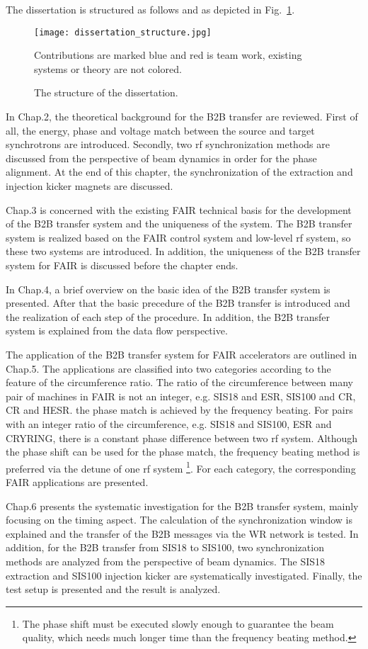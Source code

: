 The dissertation is structured as follows and as depicted in Fig.~\ref{dissertation_structure}.
\begin{figure}[!htb]
   \centering   
   \texttt{[image: dissertation\_structure.jpg]}
   \caption{The structure of the dissertation.}{Contributions are marked blue and red is team work, existing systems or theory are not colored.}
   \label{dissertation_structure}
\end{figure}

In Chap.2, the theoretical background for the B2B transfer are reviewed. First of all, the energy, phase and voltage match between the source and target synchrotrons are introduced. Secondly, two rf synchronization methods are discussed from the perspective of beam dynamics in order for the phase alignment. At the end of this chapter, the synchronization of the extraction and injection kicker magnets are discussed.

Chap.3 is concerned with the existing FAIR technical basis for the development of the B2B transfer system and the uniqueness of the system. The B2B transfer system is realized based on the FAIR control system and low-level rf system, so these two systems are introduced. In addition, the uniqueness of the B2B transfer system for FAIR is discussed before the chapter ends. 

In Chap.4, a brief overview on the basic idea of the B2B transfer system is presented. After that the basic precedure of the B2B transfer is introduced and the realization of each step of the procedure. In addition, the B2B transfer system is explained from the data flow perspective.

The application of the B2B transfer system for FAIR accelerators are outlined in Chap.5. The applications are classified into two categories according to the feature of the circumference ratio. The ratio of the circumference between many pair of machines in FAIR is not an integer, e.g. SIS18 and ESR, SIS100 and CR, CR and HESR. the phase match is achieved by the frequency beating. For pairs with an integer ratio of the circumference, e.g. SIS18 and SIS100, ESR and CRYRING, there is a constant phase difference between two rf system. Although the phase shift can be used for the phase match, the frequency beating method is preferred via the detune of one rf system \footnote{The phase shift must be executed slowly enough to guarantee the beam quality, which needs much longer time than the frequency beating method.}. For each category, the corresponding FAIR applications are presented. 

Chap.6 presents the systematic investigation for the B2B transfer system, mainly focusing on the timing aspect. The calculation of the synchronization window is explained and the transfer of the B2B messages via the WR network is tested. In addition, for the B2B transfer from SIS18 to SIS100, two synchronization methods are analyzed from the perspective of beam dynamics. The SIS18 extraction and SIS100 injection kicker are systematically investigated. Finally, the test setup is presented and the result is analyzed.

%
%
